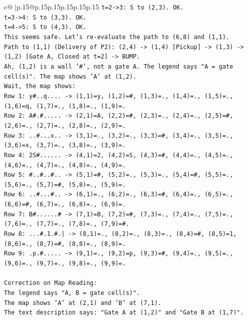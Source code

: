 \documentclass{article}
\begin{document}
{\begin{supertabular}{c@{$\;$}|p{.15\linewidth}@{}p{.15\linewidth}p{.15\linewidth}p{.15\linewidth}p{.15\linewidth}p{.15\linewidth}}
{{{\texttt{t=2{-}>3: S to (2,3). OK.} \\
\texttt{t=3{-}>4: S to (3,3). OK.} \\
\texttt{t=4{-}>5: S to (4,3). OK.} \\
\texttt{This seems safe. Let's re{-}evaluate the path to (6,8) and (1,1).} \\
\texttt{Path to (1,1) (Delivery of P2): (2,4) {-}> (1,4) {[}Pickup{]} {-}> (1,3) {-}> (1,2) {[}Gate A, Closed at t=2{]} {-}> BUMP.} \\
\texttt{Ah, (1,2) is a wall '\#', not a gate A. The legend says "A = gate cell(s)". The map shows 'A' at (1,2).} \\
\texttt{Wait, the map shows:} \\
\texttt{Row 1: y\#..q.... {-}> (1,1)=y, (1,2)=\#, (1,3)=., (1,4)=., (1,5)=., (1,6)=q, (1,7)=., (1,8)=., (1,9)=.} \\
\texttt{Row 2: A\#.\#..... {-}> (2,1)=A, (2,2)=\#, (2,3)=., (2,4)=., (2,5)=\#, (2,6)=., (2,7)=., (2,8)=., (2,9)=.} \\
\texttt{Row 3: ..\#...x.. {-}> (3,1)=., (3,2)=., (3,3)=\#, (3,4)=., (3,5)=., (3,6)=x, (3,7)=., (3,8)=., (3,9)=.} \\
\texttt{Row 4: 2S\#...... {-}> (4,1)=2, (4,2)=S, (4,3)=\#, (4,4)=., (4,5)=., (4,6)=., (4,7)=., (4,8)=., (4,9)=.} \\
\texttt{Row 5: \#..\#..\#.. {-}> (5,1)=\#, (5,2)=., (5,3)=., (5,4)=\#, (5,5)=., (5,6)=., (5,7)=\#, (5,8)=., (5,9)=.} \\
\texttt{Row 6: ..\#...\#.. {-}> (6,1)=., (6,2)=., (6,3)=\#, (6,4)=., (6,5)=., (6,6)=\#, (6,7)=., (6,8)=., (6,9)=.} \\
\texttt{Row 7: B\#......\# {-}> (7,1)=B, (7,2)=\#, (7,3)=., (7,4)=., (7,5)=., (7,6)=., (7,7)=., (7,8)=., (7,9)=\#.} \\
\texttt{Row 8: ...\#.1.\#.| {-}> (8,1)=., (8,2)=., (8,3)=., (8,4)=\#, (8,5)=1, (8,6)=., (8,7)=\#, (8,8)=., (8,9)=.} \\
\texttt{Row 9: .p.\#..... {-}> (9,1)=., (9,2)=p, (9,3)=\#, (9,4)=., (9,5)=., (9,6)=., (9,7)=., (9,8)=., (9,9)=.} \\
\\ 
\texttt{Correction on Map Reading:} \\
\texttt{The legend says "A, B = gate cell(s)".} \\
\texttt{The map shows 'A' at (2,1) and 'B' at (7,1).} \\
\texttt{The text description says: "Gate A at (1,2)" and "Gate B at (1,7)".} \\
}}}
\end{supertabular}}
\end{document}
